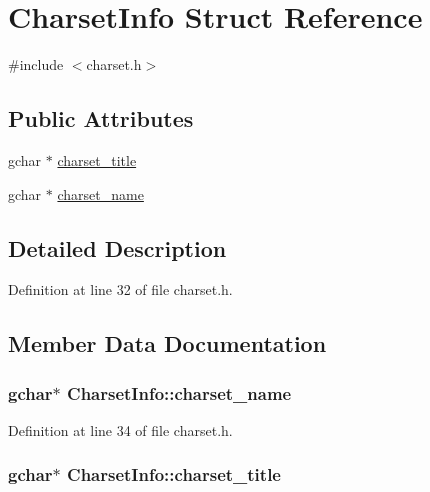 \hypertarget{struct_charset_info}{}\section{Charset\+Info Struct Reference}
\label{struct_charset_info}


{\ttfamily \#include $<$charset.\+h$>$}

\subsection*{Public Attributes}
\begin{DoxyCompactItemize}
\item 
gchar $\ast$ \hyperlink{struct_charset_info_a74232d777864a8832f46da3b7c2445f0}{charset\+\_\+title}
\item 
gchar $\ast$ \hyperlink{struct_charset_info_a63ada18ad77d7d19a2fe120074e55e31}{charset\+\_\+name}
\end{DoxyCompactItemize}


\subsection{Detailed Description}


Definition at line 32 of file charset.\+h.



\subsection{Member Data Documentation}
\subsubsection[{\texorpdfstring{charset\+\_\+name}{charset_name}}]{\setlength{\rightskip}{0pt plus 5cm}gchar$\ast$ Charset\+Info\+::charset\+\_\+name}\hypertarget{struct_charset_info_a63ada18ad77d7d19a2fe120074e55e31}{}\label{struct_charset_info_a63ada18ad77d7d19a2fe120074e55e31}


Definition at line 34 of file charset.\+h.

\subsubsection[{\texorpdfstring{charset\+\_\+title}{charset_title}}]{\setlength{\rightskip}{0pt plus 5cm}gchar$\ast$ Charset\+Info\+::charset\+\_\+title}\hypertarget{struct_charset_info_a74232d777864a8832f46da3b7c2445f0}{}\label{struct_charset_info_a74232d777864a8832f46da3b7c2445f0}


